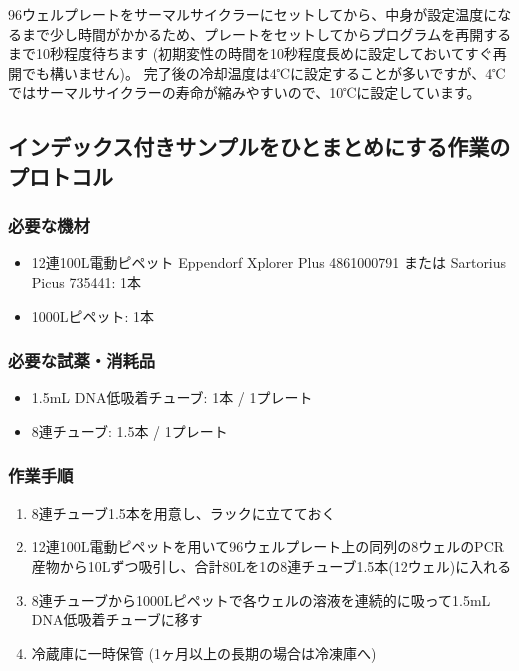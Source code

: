 \documentclass[titlepage,10pt,a4paper,uplatex]{jsbook}
\begin{document}
96ウェルプレートをサーマルサイクラーにセットしてから、中身が設定温度になるまで少し時間がかかるため、プレートをセットしてからプログラムを再開するまで10秒程度待ちます (初期変性の時間を10秒程度長めに設定しておいてすぐ再開でも構いません)。
完了後の冷却温度は4℃に設定することが多いですが、4℃ではサーマルサイクラーの寿命が縮みやすいので、10℃に設定しています。

\subsection{インデックス付きサンプルをひとまとめにする作業のプロトコル}

\subsubsection{必要な機材}
\begin{itemize}
\item 12連100{\textmu}L電動ピペット Eppendorf Xplorer Plus 4861000791 または Sartorius Picus 735441: 1本
\item 1000{\textmu}Lピペット: 1本
\end{itemize}

\subsubsection{必要な試薬・消耗品}
\begin{itemize}
\item 1.5mL DNA低吸着チューブ: 1本 / 1プレート
\item 8連チューブ: 1.5本 / 1プレート
\end{itemize}

\subsubsection{作業手順}
\begin{enumerate}
\item 8連チューブ1.5本を用意し、ラックに立てておく
\item 12連100{\textmu}L電動ピペットを用いて96ウェルプレート上の同列の8ウェルのPCR産物から10{\textmu}Lずつ吸引し、合計80{\textmu}Lを1の8連チューブ1.5本(12ウェル)に入れる
\item 8連チューブから1000{\textmu}Lピペットで各ウェルの溶液を連続的に吸って1.5mL DNA低吸着チューブに移す
\item 冷蔵庫に一時保管 (1ヶ月以上の長期の場合は冷凍庫へ)
\end{enumerate}
\end{document}
